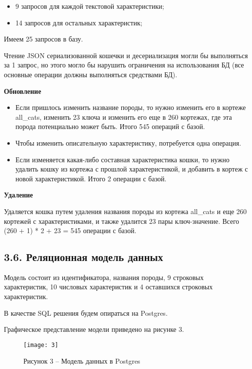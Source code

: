\begin{itemize}
    \item 9 запросов для каждой текстовой характеристики;
    \item 14 запросов для остальных характеристик;
\end{itemize}

Имеем 25 запросов в базу.

Чтение JSON сериализованной кошечки и десериализация могли бы выполняться за 1 запрос, но этого могло бы нарушить
ограничения на использования БД (все основные операции должны выполняться средствами БД).

\textbf{Обновление}
\begin{itemize}
    \item Если пришлось изменить название породы, то нужно изменить его в кортеже all\_cats, изменить 23 ключа и изменить его
  еще в 260 кортежах, где эта порода потенциально может быть. Итого 545 операций с базой.
    \item Чтобы изменить описательную характеристику, потребуется одна операция.
    \item Если изменяется какая-либо составная характеристика кошки, то нужно удалить кошку из кортежа с прошлой
  характеристикой, и добавить в кортеж с новой характеристикой. Итого 2 операции с базой.
\end{itemize}

\textbf{Удаление}

Удаляется кошка путем удаления названия породы из кортежа all\_cats и еще 260 кортежей с характеристиками, и также
удалится 23 пары ключ-значение. Всего (260 + 1) * 2 + 23 = 545 операции с базой.


\subsection*{3.6. Реляционная модель данных}
Модель состоит из идентификатора, названия породы, 9 строковых характеристик, 10 числовых характеристик и 4 оставшихся
строковых характеристик.

В качестве SQL решения будем опираться на Postgres.

Графическое представление модели приведено на рисунке 3.

\begin{figure}[H]
    \centering
    \texttt{[image: 3]}
    \caption*{Рисунок 3 -- Модель данных в Postgres}
    \label{fig:3}
\end{figure}

